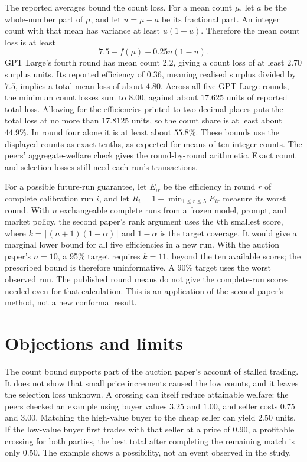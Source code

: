 \documentclass{article}
\begin{document}
The reported averages bound the count loss. For a mean count \(\mu\), let \(a\) be the whole-number part of
\(\mu\), and let \(u=\mu-a\) be its fractional part. An integer count with that mean has variance at least
\(u(1-u)\). Therefore the mean count loss is at least
\[
7.5-f(\mu)+0.25u(1-u).
\]
GPT Large's fourth round has mean count \(2.2\), giving a count loss of at least \(2.70\) surplus units. Its
reported efficiency of \(0.36\), meaning realised surplus divided by \(7.5\), implies a total mean loss of
about \(4.80\). Across all five GPT Large rounds, the minimum count losses sum to \(8.00\), against about
\(17.625\) units of reported total loss. Allowing for the efficiencies printed to two decimal places puts the
total loss at no more than \(17.8125\) units, so the count share is at least about \(44.9\%\). In round four
alone it is at least about \(55.8\%\). These bounds use the displayed counts as exact tenths, as expected for
means of ten integer counts. The peers' aggregate-welfare check gives the round-by-round arithmetic. Exact
count and selection losses still need each run's transactions.

For a possible future-run guarantee, let \(E_{ir}\) be the efficiency in round \(r\) of complete calibration
run \(i\), and let \(R_i=1-\min_{1\leq r\leq5}E_{ir}\) measure its worst round. With \(n\) exchangeable
complete runs from a frozen model, prompt, and market policy, the second paper's rank argument uses the
\(k\)th smallest score, where \(k=\lceil(n+1)(1-\alpha)\rceil\) and \(1-\alpha\) is the target coverage. It
would give a marginal lower bound for all five efficiencies in a new run. With the auction paper's \(n=10\), a
95\% target requires \(k=11\), beyond the ten available scores; the prescribed bound is therefore
uninformative. A 90\% target uses the worst observed run. The published round means do not give the
complete-run scores needed even for that calculation. This is an application of the second paper's method, not
a new conformal result.

\section{Objections and limits}

The count bound supports part of the auction paper's account of stalled trading. It does not show that small
price increments caused the low counts, and it leaves the selection loss unknown. A crossing can itself reduce
attainable welfare: the peers checked an example using buyer values \(3.25\) and \(1.00\), and seller costs
\(0.75\) and \(3.00\). Matching the high-value buyer to the cheap seller can yield \(2.50\) units. If the
low-value buyer first trades with that seller at a price of \(0.90\), a profitable crossing for both parties,
the best total after completing the remaining match is only \(0.50\). The example shows a possibility, not an
event observed in the study.
\end{document}
